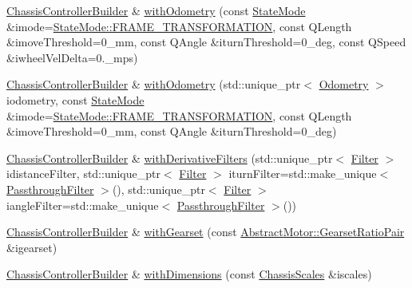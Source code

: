 \begin{DoxyCompactItemize}
\item 
\mbox{\hyperlink{classokapi_1_1ChassisControllerBuilder}{Chassis\+Controller\+Builder}} \& \mbox{\hyperlink{classokapi_1_1ChassisControllerBuilder_aa4686900014387dbc3b335ee813c3ead}{with\+Odometry}} (const \mbox{\hyperlink{namespaceokapi_af37fbd761bd859a00ff4dd4a87dd8c07}{State\+Mode}} \&imode=\mbox{\hyperlink{namespaceokapi_af37fbd761bd859a00ff4dd4a87dd8c07ad5ed7666e5cebf60d3af20a5a46edf3b}{State\+Mode\+::\+F\+R\+A\+M\+E\+\_\+\+T\+R\+A\+N\+S\+F\+O\+R\+M\+A\+T\+I\+ON}}, const Q\+Length \&imove\+Threshold=0\+\_\+mm, const Q\+Angle \&iturn\+Threshold=0\+\_\+deg, const Q\+Speed \&iwheel\+Vel\+Delta=0.\+\_\+mps)
\item 
\mbox{\hyperlink{classokapi_1_1ChassisControllerBuilder}{Chassis\+Controller\+Builder}} \& \mbox{\hyperlink{classokapi_1_1ChassisControllerBuilder_aa775099a284db24e6832022668d0a344}{with\+Odometry}} (std\+::unique\+\_\+ptr$<$ \mbox{\hyperlink{classokapi_1_1Odometry}{Odometry}} $>$ iodometry, const \mbox{\hyperlink{namespaceokapi_af37fbd761bd859a00ff4dd4a87dd8c07}{State\+Mode}} \&imode=\mbox{\hyperlink{namespaceokapi_af37fbd761bd859a00ff4dd4a87dd8c07ad5ed7666e5cebf60d3af20a5a46edf3b}{State\+Mode\+::\+F\+R\+A\+M\+E\+\_\+\+T\+R\+A\+N\+S\+F\+O\+R\+M\+A\+T\+I\+ON}}, const Q\+Length \&imove\+Threshold=0\+\_\+mm, const Q\+Angle \&iturn\+Threshold=0\+\_\+deg)
\item 
\mbox{\hyperlink{classokapi_1_1ChassisControllerBuilder}{Chassis\+Controller\+Builder}} \& \mbox{\hyperlink{classokapi_1_1ChassisControllerBuilder_a4d65988fd98e4530dfa236fce6d4d99a}{with\+Derivative\+Filters}} (std\+::unique\+\_\+ptr$<$ \mbox{\hyperlink{classokapi_1_1Filter}{Filter}} $>$ idistance\+Filter, std\+::unique\+\_\+ptr$<$ \mbox{\hyperlink{classokapi_1_1Filter}{Filter}} $>$ iturn\+Filter=std\+::make\+\_\+unique$<$ \mbox{\hyperlink{classokapi_1_1PassthroughFilter}{Passthrough\+Filter}} $>$(), std\+::unique\+\_\+ptr$<$ \mbox{\hyperlink{classokapi_1_1Filter}{Filter}} $>$ iangle\+Filter=std\+::make\+\_\+unique$<$ \mbox{\hyperlink{classokapi_1_1PassthroughFilter}{Passthrough\+Filter}} $>$())
\item 
\mbox{\hyperlink{classokapi_1_1ChassisControllerBuilder}{Chassis\+Controller\+Builder}} \& \mbox{\hyperlink{classokapi_1_1ChassisControllerBuilder_aea1e3d32abede99a1b565205275aea78}{with\+Gearset}} (const \mbox{\hyperlink{structokapi_1_1AbstractMotor_1_1GearsetRatioPair}{Abstract\+Motor\+::\+Gearset\+Ratio\+Pair}} \&igearset)
\item 
\mbox{\hyperlink{classokapi_1_1ChassisControllerBuilder}{Chassis\+Controller\+Builder}} \& \mbox{\hyperlink{classokapi_1_1ChassisControllerBuilder_a72a642f59112da74960942aae390a5ed}{with\+Dimensions}} (const \mbox{\hyperlink{classokapi_1_1ChassisScales}{Chassis\+Scales}} \&iscales)

\end{DoxyCompactItemize}

